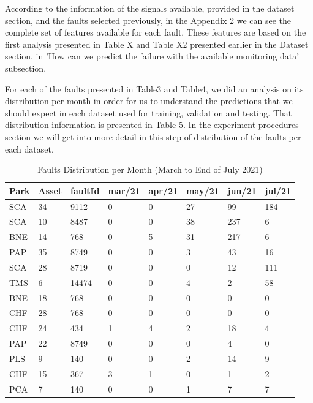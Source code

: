 According to the information of the signals available, provided in the dataset section, and the faults selected previously, in the Appendix 2 we can see the complete set of features available for each fault. These features are based on the first analysis presented in Table X and Table X2 presented earlier in the Dataset section, in 'How can we predict the failure with the available monitoring data' subsection.

For each of the faults presented in Table3 and Table4, we did an analysis on its distribution per month in order for us to understand the predictions that we should expect in each dataset used for training, validation and testing. That distribution information is presented in Table 5. In the experiment procedures section we will get into more detail in this step of distribution of the faults per each dataset.

\begin{table}[!ht]
    \centering
    \begin{tabular}{|l|l|l|l|l|l|l|l|}
    \hline
        Park & Asset & faultId & mar/21 & apr/21 & may/21 & jun/21 & jul/21 \\ \hline
        SCA & 34 & 9112 & 0 & 0 & 27 & 99 & 184 \\ \hline
        SCA & 10 & 8487 & 0 & 0 & 38 & 237 & 6 \\ \hline
        BNE & 14 & 768 & 0 & 5 & 31 & 217 & 6 \\ \hline
        PAP & 35 & 8749 & 0 & 0 & 3 & 43 & 16 \\ \hline
        SCA & 28 & 8719 & 0 & 0 & 0 & 12 & 111 \\ \hline
        TMS & 6 & 14474 & 0 & 0 & 4 & 2 & 58 \\ \hline
        BNE & 18 & 768 & 0 & 0 & 0 & 0 & 0 \\ \hline
        CHF & 28 & 768 & 0 & 0 & 0 & 0 & 0 \\ \hline
        CHF & 24 & 434 & 1 & 4 & 2 & 18 & 4 \\ \hline
        PAP & 22 & 8749 & 0 & 0 & 0 & 4 & 0 \\ \hline
        PLS & 9 & 140 & 0 & 0 & 2 & 14 & 9 \\ \hline
        CHF & 15 & 367 & 3 & 1 & 0 & 1 & 2 \\ \hline
        PCA & 7 & 140 & 0 & 0 & 1 & 7 & 7 \\ \hline
    \end{tabular}
    \caption{Faults Distribution per Month (March to End of July 2021)}
    \label{FaultsDistribitutionMarJun21}
\end{table}


